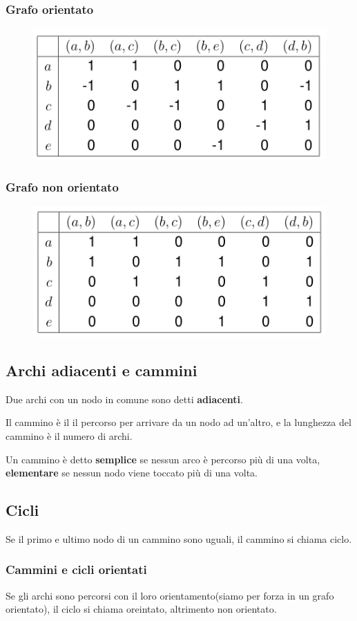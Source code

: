 \subsubsection{Grafo orientato}
\begin{figure}[h!]
    \centering
    \includegraphics[width=0.5\linewidth]{img/Screenshot from 2022-05-31 16-13-04.png}
\end{figure}

\subsubsection{Grafo non orientato}
\begin{figure}[h!]
    \centering
    \includegraphics[width=0.5\linewidth]{img/Screenshot from 2022-05-31 16-14-15.png}
\end{figure}

\subsection{Archi adiacenti e cammini}
Due archi con un nodo in comune sono detti \textbf{adiacenti}.

Il cammino è il il percorso per arrivare da un nodo ad un'altro, e la lunghezza del cammino è il numero di archi.


Un cammino è detto \textbf{semplice} se nessun arco è percorso più di una volta,
\textbf{elementare} se nessun nodo viene toccato più di una volta.

\subsection{Cicli}
Se il primo e ultimo nodo di un cammino sono uguali, il cammino si chiama ciclo.

\subsubsection{Cammini e cicli orientati}
Se gli archi sono percorsi con il loro orientamento(siamo per forza in un grafo orientato), il ciclo si chiama
oreintato, altrimento non orientato.

